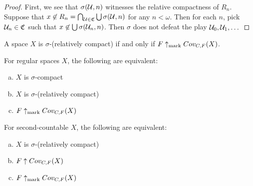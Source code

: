   \begin{proof}
    First, we see that $\sigma(\mathcal{U},n)$ witnesses the relative compactness of $R_n$. Suppose that $x \not\in R_n = \bigcap_{\mathcal{U}\in\mathfrak{C}} \bigcup\sigma(\mathcal{U},n)$ for any $n<\omega$. Then for each $n$, pick $\mathcal{U}_n\in\mathfrak{C}$ such that $x\not\in \bigcup\sigma(\mathcal{U}_n,n)$. Then $\sigma$ does not defeat the play $\mathcal{U}_0,\mathcal{U}_1,\dots$
  \end{proof}

  \begin{corollary}
    A space $X$ is $\sigma$-(relatively compact) if and only if $F \uparrow_{\text{mark}} Cov_{C,F}(X)$.
  \end{corollary}

  \begin{corollary}
    For regular spaces $X$, the following are equivalent:
      \begin{enumerate}[(a)]
        \item $X$ is $\sigma$-compact
        \item $X$ is $\sigma$-(relatively compact)
        \item $F \uparrow_{\text{mark}} Cov_{C,F}(X)$
      \end{enumerate}
  \end{corollary}

  \begin{theorem}
    For second-countable $X$, the following are equivalent:
      \begin{enumerate}[(a)]
        \item $X$ is $\sigma$-(relatively compact)
        \item $F \uparrow Cov_{C,F}(X)$
        \item $F\uparrow_{\text{mark}} Cov_{C,F}(X)$
      \end{enumerate}
  \end{theorem}

